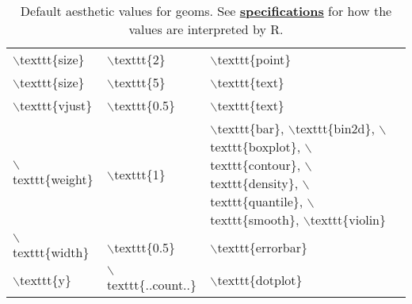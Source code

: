 \begin{table}[ht]
\begin{tabular}{lll}
  $\backslash$texttt\{size\} & $\backslash$texttt\{2\} & $\backslash$texttt\{point\} \\ 
  $\backslash$texttt\{size\} & $\backslash$texttt\{5\} & $\backslash$texttt\{text\} \\ 
  $\backslash$texttt\{vjust\} & $\backslash$texttt\{0.5\} & $\backslash$texttt\{text\} \\ 
  $\backslash$texttt\{weight\} & $\backslash$texttt\{1\} & $\backslash$texttt\{bar\}, $\backslash$texttt\{bin2d\}, $\backslash$texttt\{boxplot\}, $\backslash$texttt\{contour\}, $\backslash$texttt\{density\}, $\backslash$texttt\{quantile\}, $\backslash$texttt\{smooth\}, $\backslash$texttt\{violin\} \\ 
  $\backslash$texttt\{width\} & $\backslash$texttt\{0.5\} & $\backslash$texttt\{errorbar\} \\ 
  $\backslash$texttt\{y\} & $\backslash$texttt\{..count..\} & $\backslash$texttt\{dotplot\} \\ 
   \hline
\end{tabular}
\caption{Default aesthetic values for geoms. See \hyperref[cha:specifications]{\textbf{specifications}} for how the values are interpreted by R.} 
\label{tbl:geom-defaults}
\end{table}
